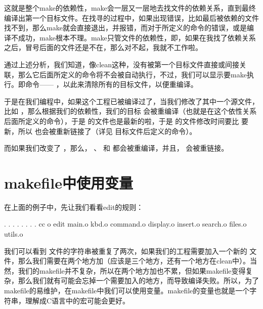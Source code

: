 \documentclass[a4paper,10pt]{sphinxmanual}
\begin{document}
这就是整个make的依赖性，make会一层又一层地去找文件的依赖关系，直到最终编译出第一个目标文件。在找寻的过程中，如果出现错误，比如最后被依赖的文件找不到，那么make就会直接退出，并报错，而对于所定义的命令的错误，或是编译不成功，make根本不理。make只管文件的依赖性，即，如果在我找了依赖关系之后，冒号后面的文件还是不在，那么对不起，我就不工作啦。

通过上述分析，我们知道，像clean这种，没有被第一个目标文件直接或间接关联，那么它后面所定义的命令将不会被自动执行，不过，我们可以显示要make执行。即命令——  ，以此来清除所有的目标文件，以便重编译。

于是在我们编程中，如果这个工程已被编译过了，当我们修改了其中一个源文件，比如  ，那么根据我们的依赖性，我们的目标  会被重编译（也就是在这个依性关系后面所定义的命令），于是  的文件也是最新的啦，于是  的文件修改时间要比  要新，所以  也会被重新链接了（详见  目标文件后定义的命令）。

而如果我们改变了  ，那么，  、  和  都会被重编译，并且，  会被重链接。


\section{makefile中使用变量}
\label{\detokenize{introduction:id3}}
在上面的例子中，先让我们看看edit的规则：

\begin{sphinxVerbatim}[commandchars=\\\{\}]
 . . . . \PYGZbs{}
        . . . .
    cc \PYGZhy{}o edit main.o kbd.o command.o display.o 
        insert.o search.o files.o utils.o
\end{sphinxVerbatim}

我们可以看到  文件的字符串被重复了两次，如果我们的工程需要加入一个新的  文件，那么我们需要在两个地方加（应该是三个地方，还有一个地方在clean中）。当然，我们的makefile并不复杂，所以在两个地方加也不累，但如果makefile变得复杂，那么我们就有可能会忘掉一个需要加入的地方，而导致编译失败。所以，为了makefile的易维护，在makefile中我们可以使用变量。makefile的变量也就是一个字符串，理解成C语言中的宏可能会更好。
\end{document}
